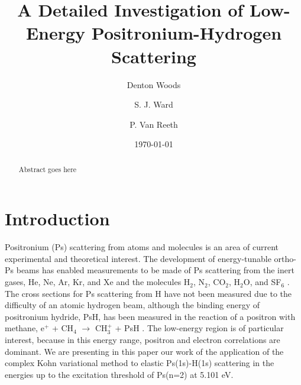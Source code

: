 \documentclass[preprint,showpacs,preprintnumbers,amsmath,amssymb]{revtex4}
\begin{document}

\title{A Detailed Investigation of Low-Energy Positronium-Hydrogen Scattering}

\author{Denton Woods}
\author{S. J. Ward}

\author{P. Van Reeth}

\date{\today}%

\begin{abstract}
Abstract goes here
\end{abstract}
   
\maketitle

\section{\label{sec:Intro}\protect Introduction}



Positronium (Ps) scattering from atoms and molecules is an area of current experimental and theoretical interest. The development of energy-tunable ortho-Ps beams \cite{Brown1985,Laricchia1987,Zafar1996,Garner1996,Laricchia2008} has enabled measurements to be made of Ps scattering from the inert gases, He, Ne, Ar, Kr, and Xe \cite{Laricchia2008,Armitage2006,Armitage2002,Engbrecht2008,Brawley2010a} and the molecules H$_2$, N$_2$, CO$_2$, H$_2$O, and SF$_6$ \cite{Brawley2010a,Beale2006}. The cross sections for Ps scattering from H have not been measured due to the difficulty
of an atomic hydrogen beam, although the binding energy of positronium hydride, PsH, has been measured in the reaction of a positron with methane, e$^+$ + CH$_4$ $\to$ CH$_3^+$ + PsH \cite{Schrader1992}.
The low-energy region is of particular interest, because in this energy range, positron and electron correlations are dominant. We are presenting in this paper our work of the application of the complex Kohn variational method to elastic Ps(1s)-H(1s) scattering in the energies up to the excitation threshold of Ps(n=2) at 5.101 eV.
\end{document}
